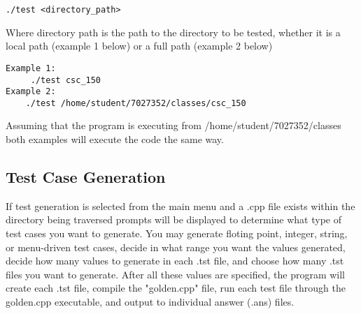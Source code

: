 \begin {lstlisting}
./test <directory_path>
\end{lstlisting}


Where directory path is the path to the directory to be tested, whether it is a local 
path (example 1 below) or a full path (example 2 below)

\begin {lstlisting}
Example 1:
     ./test csc_150
Example 2:
    ./test /home/student/7027352/classes/csc_150
\end{lstlisting}
Assuming that the program is executing from /home/student/7027352/classes both 
examples will execute the code the same way.


\subsection {Test Case Generation}
If test generation is selected from the main menu and a .cpp file exists within the directory being traversed prompts will be displayed to determine what type of test cases you want to generate. You may generate floting point,  integer, string, or menu-driven test cases, decide in what range you want the values generated, decide how many values to generate in each .tst file, and choose how many .tst files you want to generate. After all these values are specified, the program will create each .tst file, compile the "golden.cpp" file, run each test file through the golden.cpp executable, and output to individual answer (.ans) files.
